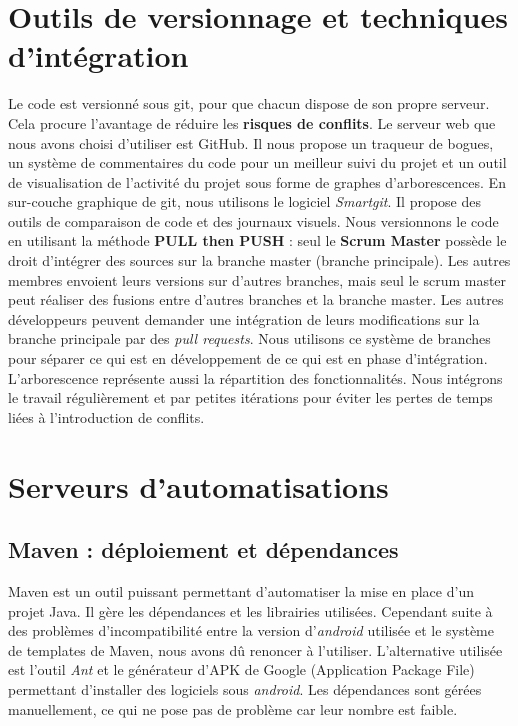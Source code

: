\section{Outils de versionnage et techniques d'intégration}
Le code est versionné sous git, pour que chacun dispose de son propre serveur. Cela procure l'avantage de réduire les \textbf{risques de conflits}. Le serveur web que nous avons choisi 
d'utiliser est GitHub. Il nous propose un traqueur de bogues, un système de commentaires du code pour un meilleur suivi du projet et un outil de visualisation de l'activité du projet sous forme de graphes d'arborescences. En sur-couche graphique de git, nous utilisons le logiciel \emph{Smartgit}. Il propose des outils de comparaison de code et des
journaux visuels.
Nous versionnons le code en utilisant la méthode \textbf{PULL then PUSH} : seul le \textbf{Scrum Master} possède le droit d'intégrer des
sources sur la branche master (branche principale). Les autres membres envoient leurs versions sur d'autres
branches, mais seul le scrum master peut réaliser des fusions entre d'autres branches et la branche master. Les
autres développeurs peuvent demander une intégration de leurs modifications sur la branche principale par des \emph{pull requests}. Nous utilisons ce système de branches pour séparer ce qui est en développement de ce qui est en phase d'intégration. L'arborescence représente aussi la répartition des fonctionnalités. Nous intégrons le travail régulièrement et par petites itérations pour éviter les pertes de temps liées à l'introduction de conflits.

\section{Serveurs d'automatisations}

\subsection{Maven : déploiement et dépendances}
Maven est un outil puissant permettant d'automatiser la mise en place d'un projet Java. Il gère les dépendances et les librairies utilisées. Cependant suite à des problèmes d'incompatibilité entre la version d'\emph{android} utilisée et le système de templates de Maven, nous avons dû renoncer à l'utiliser.
L'alternative utilisée est l'outil \emph{Ant} et le générateur d'APK de Google (Application Package File) permettant d'installer des logiciels sous \emph{android}. Les dépendances sont gérées manuellement, ce qui ne pose pas de problème car leur nombre est faible.

